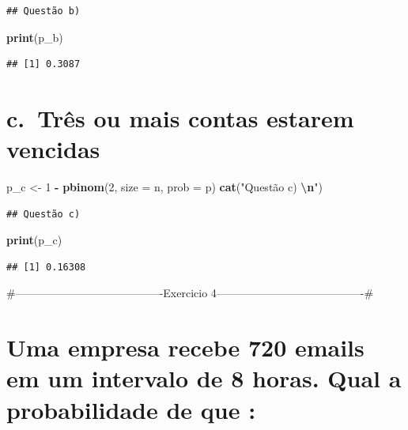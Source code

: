 \documentclass[
]{article}
\newenvironment{Shaded}{\begin{snugshade}}{\end{snugshade}}
\newcommand{\AttributeTok}[1]{\textcolor[rgb]{0.13,0.29,0.53}{#1}}
\newcommand{\DecValTok}[1]{\textcolor[rgb]{0.00,0.00,0.81}{#1}}
\newcommand{\FunctionTok}[1]{\textcolor[rgb]{0.13,0.29,0.53}{\textbf{#1}}}
\newcommand{\NormalTok}[1]{#1}
\newcommand{\OtherTok}[1]{\textcolor[rgb]{0.56,0.35,0.01}{#1}}
\newcommand{\SpecialCharTok}[1]{\textcolor[rgb]{0.81,0.36,0.00}{\textbf{#1}}}
\newcommand{\StringTok}[1]{\textcolor[rgb]{0.31,0.60,0.02}{#1}}
\begin{document}
\begin{verbatim}
## Questão b)
\end{verbatim}

\begin{Shaded}
\begin{Highlighting}[]
\FunctionTok{print}\NormalTok{(p\_b)}
\end{Highlighting}
\end{Shaded}

\begin{verbatim}
## [1] 0.3087
\end{verbatim}

\section{c.~Três ou mais contas estarem
vencidas}\label{c.-truxeas-ou-mais-contas-estarem-vencidas}

\begin{Shaded}
\begin{Highlighting}[]
\NormalTok{p\_c }\OtherTok{\textless{}{-}} \DecValTok{1} \SpecialCharTok{{-}} \FunctionTok{pbinom}\NormalTok{(}\DecValTok{2}\NormalTok{, }\AttributeTok{size =}\NormalTok{ n, }\AttributeTok{prob =}\NormalTok{ p)}
\FunctionTok{cat}\NormalTok{(}\StringTok{"Questão c) }\SpecialCharTok{\textbackslash{}n}\StringTok{"}\NormalTok{)}
\end{Highlighting}
\end{Shaded}

\begin{verbatim}
## Questão c)
\end{verbatim}

\begin{Shaded}
\begin{Highlighting}[]
\FunctionTok{print}\NormalTok{(p\_c)}
\end{Highlighting}
\end{Shaded}

\begin{verbatim}
## [1] 0.16308
\end{verbatim}

\#----------------------------------------Exercicio
4----------------------------------------\#

\section{Uma empresa recebe 720 emails em um intervalo de 8 horas. Qual
a probabilidade de que
:}\label{uma-empresa-recebe-720-emails-em-um-intervalo-de-8-horas.-qual-a-probabilidade-de-que}
\end{document}
